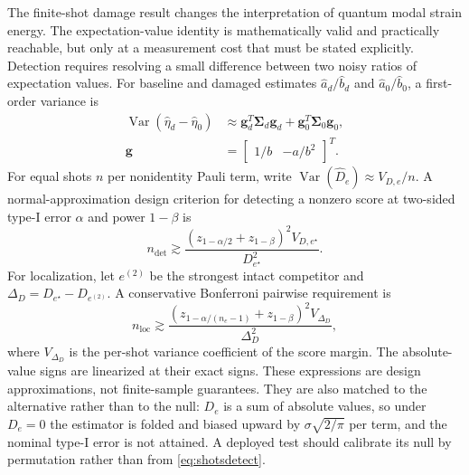 \documentclass{ieeeaccess}
\newcommand{\Var}{\operatorname{Var}}
\begin{document}
The finite-shot damage result changes the interpretation of quantum modal strain energy. The expectation-value identity is mathematically valid and practically reachable, but only at a measurement cost that must be stated explicitly. Detection requires resolving a small difference between two noisy ratios of expectation values. For baseline and damaged estimates $\widehat a_d/\widehat b_d$ and $\widehat a_0/\widehat b_0$, a first-order variance is
\begin{equation}
\begin{aligned}
\Var(\widehat\eta_d-\widehat\eta_0)
&\approx \mathbf g_d^T\boldsymbol\Sigma_d\mathbf g_d
+\mathbf g_0^T\boldsymbol\Sigma_0\mathbf g_0,\\
\mathbf g&=\begin{bmatrix}1/b&-a/b^2\end{bmatrix}^T.
\end{aligned}
\label{eq:ratiovar}
\end{equation}
For equal shots $n$ per nonidentity Pauli term, write $\Var(\widehat D_e)\approx V_{D,e}/n$. A normal-approximation design criterion for detecting a nonzero score at two-sided type-I error $\alpha$ and power $1-\beta$ is
\begin{equation}
\boxed{
n_{\mathrm{det}}\gtrsim
\frac{(z_{1-\alpha/2}+z_{1-\beta})^2V_{D,e^\star}}
{D_{e^\star}^2}.
}
\label{eq:shotsdetect}
\end{equation}
For localization, let $e^{(2)}$ be the strongest intact competitor and $\Delta_D=D_{e^\star}-D_{e^{(2)}}$. A conservative Bonferroni pairwise requirement is
\begin{equation}
\boxed{
n_{\mathrm{loc}}\gtrsim
\frac{(z_{1-\alpha/(n_e-1)}+z_{1-\beta})^2V_{\Delta_D}}
{\Delta_D^2},
}
\label{eq:shotslocalize}
\end{equation}
where $V_{\Delta_D}$ is the per-shot variance coefficient of the score margin. The absolute-value signs are linearized at their exact signs. These expressions are design approximations, not finite-sample guarantees. They are also matched to the alternative rather than to the null: $D_e$ is a sum of absolute values, so under $D_e=0$ the estimator is folded and biased upward by $\sigma\sqrt{2/\pi}$ per term, and the nominal type-I error is not attained. A deployed test should calibrate its null by permutation rather than from \cref{eq:shotsdetect}.
\end{document}
